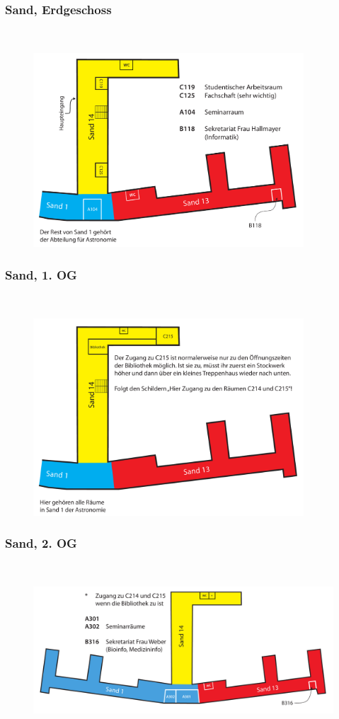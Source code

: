 \subsubsection*{Sand, Erdgeschoss}~
\begin{figure}[ht!]
	\centering
	\includegraphics[width=0.9\textwidth]{info/anhang/lageplaene/sand_eg.pdf}
\end{figure}
\vfill 
\subsubsection*{Sand, 1. OG}~
\begin{figure}[ht!]
	\centering
	\includegraphics[width=0.9\textwidth]{info/anhang/lageplaene/sand_1og.pdf}
\end{figure}
\subsubsection*{Sand, 2. OG}~
\begin{figure}[ht!]
	\centering
	\includegraphics[width=\textwidth]{info/anhang/lageplaene/sand_2og.pdf}
\end{figure}